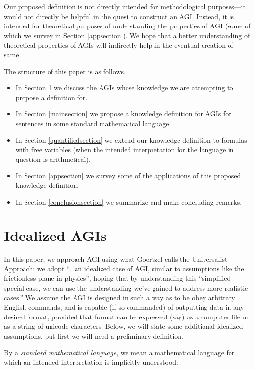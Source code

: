 \documentclass[runningheads]{llncs}
\begin{document}
Our proposed definition is not directly intended
for methodological purposes---it would not
directly be helpful in the quest to construct an AGI. Instead, it is intended for
theoretical purposes of understanding the properties of AGI (some of which
we survey in Section \ref{appsection}). We hope that a better
understanding of theoretical properties of AGIs will indirectly help in the eventual
creation of same.

The structure of this paper is as follows.
\begin{itemize}
  \item In Section \ref{agisection} we discuss the AGIs whose knowledge we are
  attempting to propose a definition for.
  \item In Section \ref{mainsection} we propose a knowledge definition for
  AGIs for sentences in some standard mathematical language.
  \item In Section \ref{quantifiedsection} we extend our knowledge definition
  to formulas with free variables (when the intended interpretation for the
  language in question is arithmetical).
  \item In Section \ref{appsection} we survey some of the applications of
  this proposed knowledge definition.
  \item In Section \ref{conclusionsection} we summarize and make concluding remarks.
\end{itemize}

\section{Idealized AGIs}
\label{agisection}



In this paper, we approach AGI using what
Goertzel \cite{goertzel2014artificial} calls
the Universalist Approach:
we adopt ``...an idealized case of AGI, similar to
assumptions like the frictionless plane in physics'', hoping that by
understanding this ``simplified special
case, we can use the understanding we've gained to address more realistic
cases.'' We assume the AGI is designed in such a way as to be obey arbitrary
English commands, and is capable (if so commanded) of outputting data in
any desired format, provided that format can be expressed (say) as a computer
file or as a string of unicode characters. Below, we will state some additional
idealized assumptions, but first we will need a preliminary definition.

\begin{definition}
\label{stdmathematicallanguagedefn}
By a \emph{standard mathematical language}, we mean a mathematical language for which an
intended interpretation is implicitly understood.
\end{definition}
\end{document}
